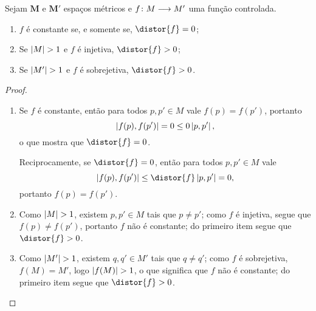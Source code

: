 \begin{proposition}
\label{prop:distorcao.injetiva.sobrejetiva}
Sejam $\bm M$ e $\bm M'$ espaços métricos e ${f}\colon {M} \longrightarrow {M'}$ uma função controlada.
	\begin{enumerate}
	\item $f$ é constante se, e somente se, $\distor{f} = 0$;
	\item Se $\left\lvert{M}\right\rvert > 1$ e $f$ é injetiva, $\distor{f} > 0$;
	\item Se $\left\lvert{M'}\right\rvert > 1$ e $f$ é sobrejetiva, $\distor{f} > 0$.
	\end{enumerate}
\end{proposition}
\begin{proof}
	\begin{enumerate}
	\item Se $f$ é constante, então para todos $p,p' \in M$ vale $f(p)=f(p')$, portanto
		\begin{equation*}
		\left\vert{f(p)},{f(p')}\right\vert = 0 \leq 0 \left\vert{p},{p'}\right\vert,
		\end{equation*}
	o que mostra que $\distor{f} = 0$.
	
	Reciprocamente, se $\distor{f}=0$, então para todos $p,p' \in M$ vale
		\begin{equation*}
		\dist{f(p)}{f(p')} \leq \distor{f}\dist{p}{p'} = 0,
		\end{equation*}
	portanto $f(p) = f(p')$.

	\item Como $\left\lvert{M}\right\rvert > 1$, existem $p,p' \in M$ tais que $p \neq p'$; como $f$ é injetiva, segue que $f(p) \neq f(p')$, portanto $f$ não é constante; do primeiro item segue que $\distor{f} > 0$.

	\item Como $\left\lvert{M'}\right\rvert > 1$, existem $q,q' \in M'$ tais que $q \neq q'$; como $f$ é sobrejetiva, $f(M) = M'$, logo $\left\lvert{f(M)}\right\rvert > 1$, o que significa que $f$ não é constante; do primeiro item segue que $\distor{f} > 0$.
	\end{enumerate}
\end{proof}

